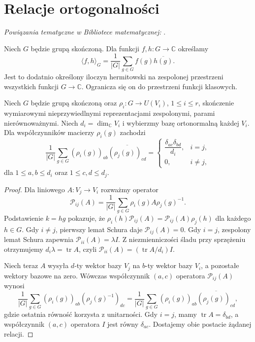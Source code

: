 \section{Relacje ortogonalności}

\noindent\emph{Powiązania tematyczne w Bibliotece matematycznej:} .

\begin{definicja}
\label{aa:def:character-inner-product}
Niech \(G\) będzie grupą skończoną.
Dla funkcji \(f,h:G\to\mathbb C\) określamy
\[
\langle f,h\rangle_G
=\frac1{|G|}\sum_{g\in G}f(g)\overline{h(g)}.
\]
Jest to dodatnio określony iloczyn hermitowski
na zespolonej przestrzeni wszystkich funkcji \(G\to\mathbb C\).
Ogranicza się on do przestrzeni funkcji klasowych.
\end{definicja}

\begin{twierdzenie}
\label{aa:tw:matrix-orthogonality}
Niech \(G\) będzie grupą skończoną oraz
\(\rho_i:G\to U(V_i)\), \(1\le i\le r\),
skończenie wymiarowymi nieprzywiedlnymi reprezentacjami
zespolonymi, parami nierównoważnymi.
Niech \(d_i=\dim_{\mathbb C}V_i\) i wybierzmy
bazę ortonormalną każdej \(V_i\). Dla współczynników
macierzy \(\rho_i(g)\) zachodzi
\[
\frac1{|G|}\sum_{g\in G}
(\rho_i(g))_{ab}\overline{(\rho_j(g))_{cd}}
=\begin{cases}
\dfrac{\delta_{ac}\delta_{bd}}{d_i},&i=j,\\[3pt]
0,&i\ne j,
\end{cases}
\]
dla \(1\le a,b\le d_i\) oraz \(1\le c,d\le d_j\).
\end{twierdzenie}
\begin{proof}
Dla liniowego \(A:V_j\to V_i\) rozważmy operator
\[
\mathcal P_{ij}(A)=\frac1{|G|}\sum_{g\in G}
\rho_i(g)A\rho_j(g)^{-1}.
\]
Podstawienie \(k=hg\) pokazuje, że
\(\rho_i(h)\mathcal P_{ij}(A)
=\mathcal P_{ij}(A)\rho_j(h)\) dla każdego \(h\in G\).
Gdy \(i\ne j\), pierwszy lemat Schura daje
\(\mathcal P_{ij}(A)=0\). Gdy \(i=j\), zespolony
lemat Schura zapewnia \(\mathcal P_{ii}(A)=\lambda I\).
Z niezmienniczości śladu przy sprzężeniu otrzymujemy
\(d_i\lambda=\operatorname{tr}A\), czyli
\(\mathcal P_{ii}(A)=(\operatorname{tr}A/d_i)I\).

Niech teraz \(A\) wysyła \(d\)-ty wektor bazy \(V_j\)
na \(b\)-ty wektor bazy \(V_i\), a pozostałe
wektory bazowe na zero. Wówczas współczynnik
\((a,c)\) operatora \(\mathcal P_{ij}(A)\) wynosi
\[
\frac1{|G|}\sum_{g\in G}
(\rho_i(g))_{ab}(\rho_j(g)^{-1})_{dc}
=\frac1{|G|}\sum_{g\in G}
(\rho_i(g))_{ab}\overline{(\rho_j(g))_{cd}},
\]
gdzie ostatnia równość korzysta z unitarności.
Gdy \(i=j\), mamy
\(\operatorname{tr}A=\delta_{bd}\), a współczynnik
\((a,c)\) operatora \(I\) jest równy \(\delta_{ac}\).
Dostajemy obie postacie żądanej relacji.
\end{proof}

